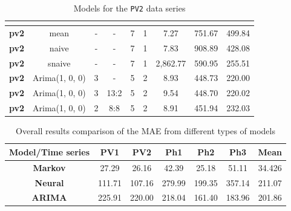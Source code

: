 \documentclass[12pt,a4paper,titlepage]{report}
\begin{document}
\begin{appendices}
\begin{table}[h]
\begin{tabular}{|c|c|c|c|c|c|c|c|c|}
        \textbf{}         &                         &   &      &   &   &          &        &        \\ \hline
        \textbf{pv2}      & mean                    & - & -    & 7 & 1 & 7.27     & 751.67 & 499.84 \\ \hline
        \textbf{pv2}      & naive                   & - & -    & 7 & 1 & 7.83     & 908.89 & 428.08 \\ \hline
        \textbf{pv2}      & snaive                  & - & -    & 7 & 1 & 2,862.77 & 590.95 & 255.51 \\ \hline
        \textbf{pv2}      & Arima(1, 0, 0)          & 3 & -    & 5 & 2 & 8.93     & 448.73 & 220.00 \\ \hline
        \textbf{pv2}      & Arima(1, 0, 0)          & 3 & 13:2 & 5 & 2 & 9.54     & 448.70 & 220.02 \\ \hline
        \textbf{pv2}      & Arima(1, 0, 0)          & 2 & 8:8  & 5 & 2 & 8.91     & 451.94 & 232.03 \\ \hline
    \end{tabular}
    
    \centering
    \caption{Models for the \texttt{PV2} data series}
    \label{pv2results}
\end{table}

\begin{table}[h]
    \begin{tabular}{|c|c|c|c|c|c|c|}
        \hline
        \textbf{Model/Time series} & \textbf{PV1} & \textbf{PV2} & \textbf{Ph1} & \textbf{Ph2} & \textbf{Ph3} & \textbf{Mean} \\ \hline
        \textbf{Markov}            & 27.29        & 26.16        & 42.39        & 25.18        & 51.11        & 34.426        \\ \hline
        \textbf{Neural}            & 111.71       & 107.16       & 279.99       & 199.35       & 357.14       & 211.07        \\ \hline
        \textbf{ARIMA}             & 225.91       & 220.00       & 218.04       & 161.40       & 183.96       & 201.86        \\ \hline
    \end{tabular}

    \centering
    \caption{Overall results comparison of the MAE from different types of models}
    \label{overallcomparisonMAE}
\end{table}

\end{appendices}
\end{document}
